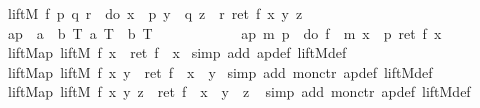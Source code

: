 \begin{isabellebody}
\ {\isachardoublequote}liftM{}\ f\ p\ q\ r\ {\isasymequiv}\ do\ {\isacharbraceleft}x\ {\isasymleftarrow}\ p{\isacharsemicolon}\ y\ {\isasymleftarrow}\ q{\isacharsemicolon}\ z\ {\isasymleftarrow}\ r{\isacharsemicolon}\ ret\ {\isacharparenleft}f\ x\ y\ z{\isacharparenright}{\isacharbraceright}{\isachardoublequote}\isanewline
\ %
\isanewline
\ ap\ {\isacharcolon}{\isacharcolon}\ {\isachardoublequote}{\isacharbrackleft}{\isacharparenleft}{\isacharprime}a\ {\isasymRightarrow}\ {\isacharprime}b{\isacharparenright}\ T{\isacharcomma}\ {\isacharprime}a\ T{\isacharbrackright}\ {\isasymRightarrow}\ {\isacharprime}b\ T{\isachardoublequote}\ \ \ \ \ \ \ \ \ {\isacharparenleft}\ {\isachardoublequote}{\isachardollar}{\isachardollar}{\isachardoublequote}\ {}{}{}{\isacharparenright}\isanewline
\ {\isachardoublequote}ap\ m\ p\ {\isasymequiv}\ do\ {\isacharbraceleft}f\ {\isasymleftarrow}\ m{\isacharsemicolon}\ x\ {\isasymleftarrow}\ p{\isacharsemicolon}\ ret\ {\isacharparenleft}f\ x{\isacharparenright}{\isacharbraceright}{\isachardoublequote}\isanewline
\isanewline
\isamarkupfalse%
\ liftM{\isacharunderscore}ap{\isacharcolon}\ {\isachardoublequote}liftM\ f\ x\ {\isacharequal}\ {\isacharparenleft}ret\ f\ {\isachardollar}{\isachardollar}\ x{\isacharparenright}{\isachardoublequote}\isanewline
\isamarkupfalse%
\ {\isacharparenleft}simp\ add{\isacharcolon}\ ap{\isacharunderscore}def\ liftM{\isacharunderscore}def{\isacharparenright}\isanewline
\isanewline
\isamarkupfalse%
\ liftM{}{\isacharunderscore}ap{\isacharcolon}\ {\isachardoublequote}liftM{}\ f\ x\ y\ {\isacharequal}\ {\isacharparenleft}ret\ f\ {\isachardollar}{\isachardollar}\ x\ {\isachardollar}{\isachardollar}\ y{\isacharparenright}{\isachardoublequote}\isanewline
\isamarkupfalse%
\ {\isacharparenleft}simp\ add{\isacharcolon}\ mon{\isacharunderscore}ctr\ ap{\isacharunderscore}def\ liftM{}{\isacharunderscore}def{\isacharparenright}\isanewline
\isanewline
\isamarkupfalse%
\ liftM{}{\isacharunderscore}ap{\isacharcolon}\ {\isachardoublequote}liftM{}\ f\ x\ y\ z\ {\isacharequal}\ ret\ f\ {\isachardollar}{\isachardollar}\ x\ {\isachardollar}{\isachardollar}\ y\ {\isachardollar}{\isachardollar}\ z{\isachardoublequote}\isanewline
\ \isamarkupfalse%
simp\ add{\isacharcolon}\ mon{\isacharunderscore}ctr\ ap{\isacharunderscore}def\ liftM{}{\isacharunderscore}def{\isacharparenright}\isanewline

\end{isabellebody}
